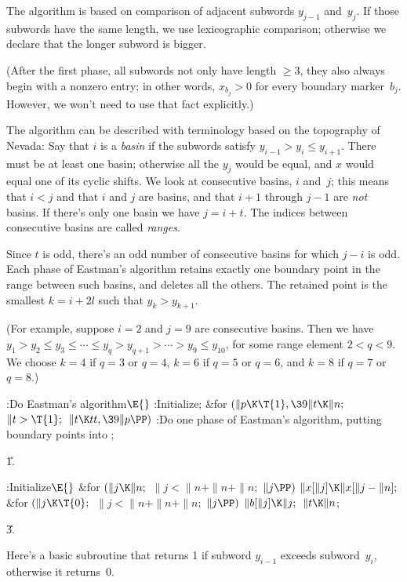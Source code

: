 The algorithm is based on comparison of adjacent subwords $y_{j-1}$ and~$y_j$.
If those subwords have the same length, we use lexicographic comparison;
otherwise we declare that the longer subword is bigger.

(After the first phase, all subwords not only have length $\ge3$, they also
always begin with a nonzero entry; in other words, $x_{b_j}>0$ for every
boundary marker~$b_j$. However, we won't need to use that fact explicitly.)

The algorithm can be described with terminology based on the topography
of Nevada: Say that $i$ is a {\it basin\/} if the subwords satisfy
$y_{i-1}>y_i\le y_{i+1}$. There must be at least one basin; otherwise all
the $y_j$ would be equal, and $x$ would equal one of its cyclic shifts.
We look at consecutive basins, $i$ and~$j$; this means that $i<j$ and that
$i$ and $j$ are basins, and that $i+1$ through $j-1$ are {\it not\/} basins.
If there's only one basin we have $j=i+t$.
The indices between consecutive basins are called {\it ranges\/}.

Since $t$ is odd, there's an odd number of consecutive basins for which
$j-i$ is odd. Each phase of Eastman's algorithm retains exactly one boundary
point in the range between such basins, and deletes all the others.
The retained point is the smallest $k=i+2l$ such that $y_k>y_{k+1}$.

(For example, suppose $i=2$ and $j=9$ are consecutive basins. Then we have
$y_1>y_2\le y_3\le\cdots\le y_q>y_{q+1}>\cdots>y_9\le y_{10}$, for some
range element $2<q<9$. We choose $k=4$ if $q=3$ or $q=4$,
$k=6$ if $q=5$ or $q=6$, and $k=8$ if $q=7$ or $q=8$.)

\Y\B\4:Do Eastman's algorithm\X${}\E{}$\6
:Initialize\X;\6
\&{for} ${}(\|p\K\T{1},\39\|t\K\|n;{}$ ${}\|t>\T{1};{}$ ${}\|t\K\\{tt},\39\|p%
\PP){}$\1\5
:Do one phase of Eastman's algorithm, putting  boundary points
into \X;\2\par
\U1.\fi

\B{}:Initialize\X${}\E{}$\6
\&{for} ${}(\|j\K\|n;{}$ ${}\|j<\|n+\|n+\|n;{}$ ${}\|j\PP){}$\1\5
${}\|x[\|j]\K\|x[\|j-\|n];{}$\2\6
\&{for} ${}(\|j\K\T{0};{}$ ${}\|j<\|n+\|n+\|n;{}$ ${}\|j\PP){}$\1\5
${}\|b[\|j]\K\|j;{}$\2\6
${}\|t\K\|n{}$;\par
\U3.\fi

Here's a basic subroutine that returns 1 if subword $y_{i-1}$ exceeds
subword~$y_i$, otherwise it returns~0.


